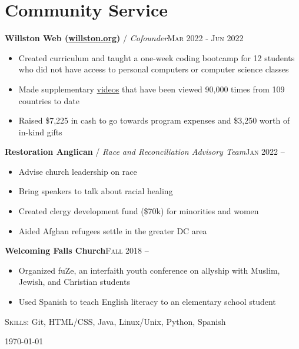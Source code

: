 \documentclass[12pt, a4paper]{article}
\begin{document}
\vspace{-8mm}
\section*{Community Service}
\vspace{-2mm}

\textbf{Willston Web (\href{https://willston.org}{willston.org})} / \textit{Cofounder}\hfill\textsc{Mar 2022 - Jun 2022}\\
\begin{itemize}
    \vspace{-8mm}
    \item Created curriculum and taught a one-week coding bootcamp for 12 students who did not have access to personal computers or computer science classes
    \item Made supplementary \href{https://youtube.com/JonathanBuchh}{videos} that have been viewed 90,000 times from 109 countries to date
    \item Raised \$7,225 in cash to go towards program expenses and \$3,250 worth of in-kind gifts
\end{itemize}

\textbf{Restoration Anglican} / \textit{Race and Reconciliation Advisory Team}\hfill\textsc{Jan 2022 --}\\
\begin{itemize}
    \vspace{-8mm}
    \item Advise church leadership on race
    \item Bring speakers to talk about racial healing
    \item Created clergy development fund (\$70k) for minorities and women
    \item Aided Afghan refugees settle in the greater DC area
\end{itemize}

\textbf{Welcoming Falls Church}\hfill\textsc{Fall 2018 --}\\
\begin{itemize}
    \vspace{-8mm}
    \item Organized fuZe, an interfaith youth conference on allyship with Muslim, Jewish, and Christian students
    \item Used Spanish to teach English literacy to an elementary school student
\end{itemize}

\vspace{-2mm}
\textsc{Skills}: Git, HTML/CSS, Java, Linux/Unix, Python, Spanish\\

\vspace{-6mm}
\begin{center}
{\scriptsize\today\- }
\end{center}
\end{document}
